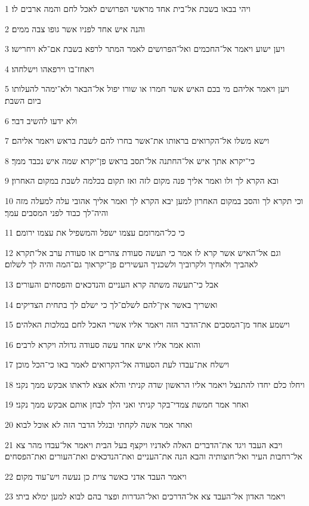 \par 1 ויהי בבאו בשבת אל־בית אחד מראשי הפרושים לאכל לחם והמה ארבים לו׃
\par 2 והנה איש אחד לפניו אשר גופו צבה ממים׃
\par 3 ויען ישוע ויאמר אל־החכמים ואל־הפרושים לאמר המתר לרפא בשבת אם־לא ויחרישו׃
\par 4 ויאחז־בו וירפאהו וישלחהו׃
\par 5 ויען ויאמר אליהם מי בכם האיש אשר חמרו או שורו יפול אל־הבאר ולא־ימהר להעלותו ביום השבת׃
\par 6 ולא ידעו להשיב דבר׃
\par 7 וישא משלו אל־הקרואים בראותו את־אשר בחרו להם לשבת בראש ויאמר אליהם׃
\par 8 כי־יקרא אתך איש אל־החתנה אל־תסב בראש פן־יקרא שמה איש נכבד ממך׃
\par 9 ובא הקרא לך ולו ואמר אליך פנה מקום לזה ואז תקום בכלמה לשבת במקום האחרון׃
\par 10 וכי תקרא לך והסב במקום האחרון למען יבא הקרא לך ואמר אליך אהובי עלה למעלה מזה והיה־לך כבוד לפני המסבים עמך׃
\par 11 כי כל־המרומם עצמו ישפל והמשפיל את עצמו ירומם׃
\par 12 וגם אל־האיש אשר קרא לו אמר כי תעשה סעודת צהרים או סעודת ערב אל־תקרא לאהביך ולאחיך ולקרוביך ולשכניך העשירים פן־יקראוך גם־המה והיה לך לשלום׃
\par 13 אבל כי־תעשה משתה קרא העניים והנדכאים והפסחים והעורים׃
\par 14 ואשריך באשר אין־להם לשלם־לך כי ישלם לך בתחית הצדיקים׃
\par 15 וישמע אחד מן־המסבים את־הדבר הזה ויאמר אליו אשרי האכל לחם במלכות האלהים׃
\par 16 והוא אמר אליו איש אחד עשה סעודה גדולה ויקרא לרבים׃
\par 17 וישלח את־עבדו לעת הסעודה אל־הקרואים לאמר באו כי־הכל מוכן׃
\par 18 ויחלו כלם יחדו להתנצל ויאמר אליו הראשון שדה קניתי והלא אצא לראתו אבקש ממך נקני׃
\par 19 ואחר אמר חמשת צמדי־בקר קניתי ואני הלך לבחן אותם אבקש ממך נקני׃
\par 20 ואחר אמר אשה לקחתי ובגלל הדבר הזה לא אוכל לבוא׃
\par 21 ויבא העבד ויגד את־הדברים האלה לאדניו ויקצף בעל הבית ויאמר אל־עבדו מהר צא אל־רחבות העיר ואל־חוצותיה והבא הנה את־העניים ואת־הנדכאים ואת־העורים ואת־הפסחים׃
\par 22 ויאמר העבד אדני כאשר צוית כן נעשה ויש־עוד מקום׃
\par 23 ויאמר האדון אל־העבד צא אל־הדרכים ואל־הגדרות ופצר בהם לבוא למען ימלא ביתי׃
